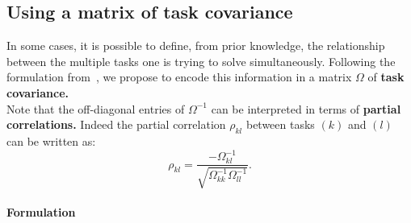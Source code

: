 \documentclass[12pt,a4paper]{article}
\newcommand{\sset}{S}
\newcommand{\vset}{V}
\begin{document}
\subsection{Using a matrix of task covariance}

In some cases, it is possible to define, from prior knowledge, the relationship between the multiple tasks one is trying to solve simultaneously.
Following the formulation from~\cite{zhang09}, we propose to encode this information in a matrix $\Omega$ of {\bf task covariance.}\\

Note that the off-diagonal entries of $\Omega^{-1}$ can be interpreted in terms of {\bf partial correlations.}
Indeed the partial correlation $\rho_{kl}$ between tasks $(k)$ and $(l)$ can be written as:
\[
\rho_{kl} = \frac{- \Omega_{kl}^{-1}}{\sqrt{\Omega_{kk}^{-1} \Omega_{ll}^{-1}}}.
\]

\paragraph{Formulation}

\end{document}
